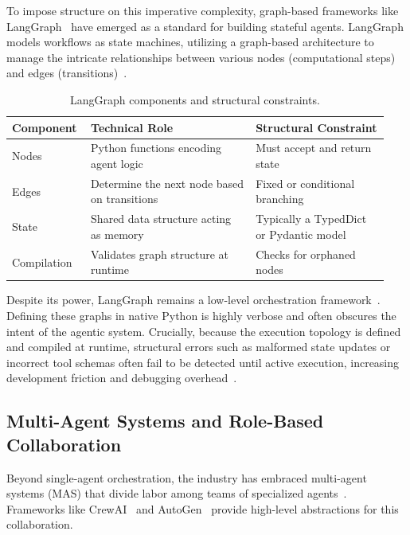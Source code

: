 \documentclass[sigconf,nonacm]{acmart}
\begin{document}
To impose structure on this imperative complexity, graph-based frameworks
like LangGraph~\cite{langgraph2024} have emerged as a standard for building
stateful agents. LangGraph models workflows as state machines, utilizing a
graph-based architecture to manage the intricate relationships between
various nodes (computational steps) and edges (transitions)~\cite{langgraph2024}.

\begin{table}[t]
  \centering
  \caption{LangGraph components and structural constraints.}
  \label{tab:langgraph-components}
  \small
  \begin{tabular}{@{}p{0.18\linewidth}p{0.42\linewidth}p{0.34\linewidth}@{}}
    \toprule
    \textbf{Component} & \textbf{Technical Role} & \textbf{Structural Constraint} \\
    \midrule
    Nodes & Python functions encoding agent logic & Must accept and return state \\
    Edges & Determine the next node based on transitions & Fixed or conditional branching \\
    State & Shared data structure acting as memory & Typically a TypedDict or Pydantic model \\
    Compilation & Validates graph structure at runtime & Checks for orphaned nodes \\
    \bottomrule
  \end{tabular}
\end{table}

Despite its power, LangGraph remains a low-level orchestration
framework~\cite{langgraph2024}. Defining these graphs in native Python is
highly verbose and often obscures the intent of the agentic system.
Crucially, because the execution topology is defined and compiled at
runtime, structural errors such as malformed state updates or incorrect tool
schemas often fail to be detected until active execution, increasing
development friction and debugging overhead~\cite{langgraph2024,docker2025cagent}.

\subsection{Multi-Agent Systems and Role-Based Collaboration}
\label{sec:litreview:mas}

Beyond single-agent orchestration, the industry has embraced multi-agent
systems (MAS) that divide labor among teams of specialized
agents~\cite{crewai2024,autogen2024}. Frameworks like CrewAI~\cite{crewai2024}
and AutoGen~\cite{autogen2024} provide high-level abstractions for this
collaboration.
\end{document}
